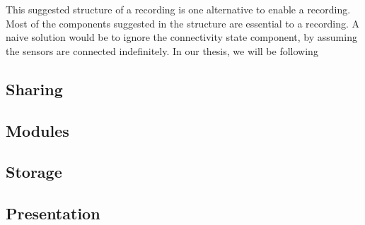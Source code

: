 This suggested structure of a recording is one alternative to enable a recording. Most of the components suggested in the structure are essential to a recording. A naive solution would be to ignore the connectivity state component, by assuming the sensors are connected indefinitely. In our thesis, we will be following 


\subsection{Sharing}

\subsection{Modules}

\subsection{Storage}

\subsection{Presentation}
